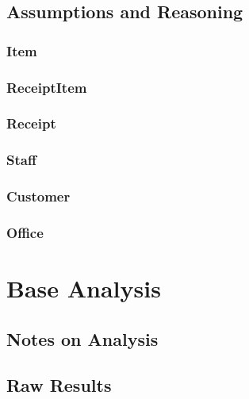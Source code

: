 \documentclass{article}
\begin{document}
        \newpage
        \subsection{Assumptions and Reasoning}
        \label{sec:AR}
            \subsubsection{Item}

            \subsubsection{ReceiptItem}

            \subsubsection{Receipt}

            \subsubsection{Staff}

            \subsubsection{Customer}

            \subsubsection{Office}

    \section{Base Analysis}
    \label{sec:BA}

        \subsection{Notes on Analysis}

            \subsection{Raw Results}
\end{document}
